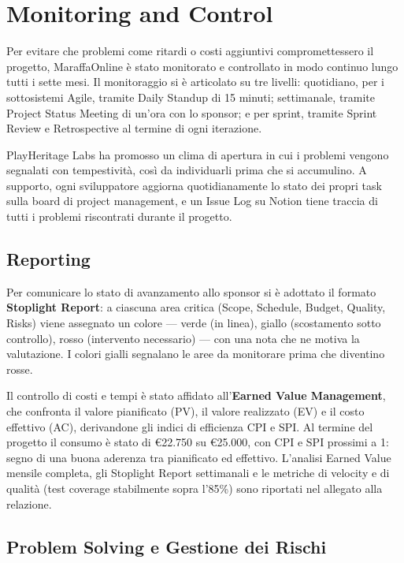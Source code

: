 \chapter{Monitoring and Control}

Per evitare che problemi come ritardi o costi aggiuntivi compromettessero il progetto, MaraffaOnline è stato monitorato e controllato in modo continuo lungo tutti i sette mesi. Il monitoraggio si è articolato su tre livelli: quotidiano, per i sottosistemi Agile, tramite Daily Standup di 15 minuti; settimanale, tramite Project Status Meeting di un'ora con lo sponsor; e per sprint, tramite Sprint Review e Retrospective al termine di ogni iterazione.

PlayHeritage Labs ha promosso un clima di apertura in cui i problemi vengono segnalati con tempestività, così da individuarli prima che si accumulino. A supporto, ogni sviluppatore aggiorna quotidianamente lo stato dei propri task sulla board di project management, e un Issue Log su Notion tiene traccia di tutti i problemi riscontrati durante il progetto.

\section{Reporting}

Per comunicare lo stato di avanzamento allo sponsor si è adottato il formato \textbf{Stoplight Report}: a ciascuna area critica (Scope, Schedule, Budget, Quality, Risks) viene assegnato un colore --- verde (in linea), giallo (scostamento sotto controllo), rosso (intervento necessario) --- con una nota che ne motiva la valutazione. I colori gialli segnalano le aree da monitorare prima che diventino rosse.

Il controllo di costi e tempi è stato affidato all'\textbf{Earned Value Management}, che confronta il valore pianificato (PV), il valore realizzato (EV) e il costo effettivo (AC), derivandone gli indici di efficienza CPI e SPI. Al termine del progetto il consumo è stato di €22.750 su €25.000, con CPI e SPI prossimi a 1: segno di una buona aderenza tra pianificato ed effettivo. L'analisi Earned Value mensile completa, gli Stoplight Report settimanali e le metriche di velocity e di qualità (test coverage stabilmente sopra l'85\%) sono riportati nel  allegato alla relazione.

\section{Problem Solving e Gestione dei Rischi}

